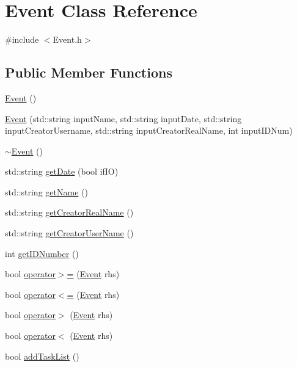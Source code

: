 \hypertarget{class_event}{}\section{Event Class Reference}
\label{class_event}


{\ttfamily \#include $<$Event.\+h$>$}

\subsection*{Public Member Functions}
\begin{DoxyCompactItemize}
\item 
\mbox{\hyperlink{class_event_a5a40dd4708297f7031e29b39e039ae10}{Event}} ()
\item 
\mbox{\hyperlink{class_event_a5104d721f8a1b03dacbb8c40ef4bcb82}{Event}} (std\+::string input\+Name, std\+::string input\+Date, std\+::string input\+Creator\+Username, std\+::string input\+Creator\+Real\+Name, int input\+I\+D\+Num)
\item 
\mbox{\hyperlink{class_event_a7704ec01ce91e673885792054214b3d2}{$\sim$\+Event}} ()
\item 
std\+::string \mbox{\hyperlink{class_event_a1b800fe1b0055d8bbd1711b7e1c9fabd}{get\+Date}} (bool if\+IO)
\item 
std\+::string \mbox{\hyperlink{class_event_adf0f3e50061123d6f24200661eeb66eb}{get\+Name}} ()
\item 
std\+::string \mbox{\hyperlink{class_event_a06b528ce79f5b78eeee98b6fd428522d}{get\+Creator\+Real\+Name}} ()
\item 
std\+::string \mbox{\hyperlink{class_event_a89a5b51bde088fb8b85732655f593046}{get\+Creator\+User\+Name}} ()
\item 
int \mbox{\hyperlink{class_event_a05365632b5779127ba605cced499bb31}{get\+I\+D\+Number}} ()
\item 
bool \mbox{\hyperlink{class_event_a44f9197c76b0bee4aa9fd8b383165474}{operator$>$=}} (\mbox{\hyperlink{class_event}{Event}} rhs)
\item 
bool \mbox{\hyperlink{class_event_a4904fea0b4f4f5bd57ba4858414f32ed}{operator$<$=}} (\mbox{\hyperlink{class_event}{Event}} rhs)
\item 
bool \mbox{\hyperlink{class_event_aceb2fbaf2cb83f5d7e14787db516cd34}{operator$>$}} (\mbox{\hyperlink{class_event}{Event}} rhs)
\item 
bool \mbox{\hyperlink{class_event_a8246f658d031aac8fb87cf9ab25d6047}{operator$<$}} (\mbox{\hyperlink{class_event}{Event}} rhs)
\item 
bool \mbox{\hyperlink{class_event_aea4ec6f1a93920ffc1dd5b15a4ab0e19}{add\+Task\+List}} ()
\end{DoxyCompactItemize}

